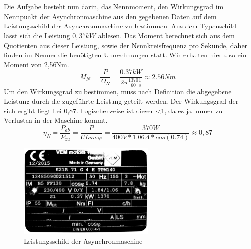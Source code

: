 \section{}
Die Aufgabe besteht nun darin, das Nennmoment, den Wirkungsgrad im Nennpunkt der Asynchronmaschine aus den gegebenen Daten auf dem Leistungsschild der Asynchronmaschine zu bestimmen. Aus dem Typenschild lässt sich die Leistung $ 0,37kW $ ablesen. Das Moment berechnet sich aus dem Quotienten aus dieser Leistung, sowie der Nennkreisfrequenz pro Sekunde, daher finden im Nenner die benötigten Umrechnungen statt. Wir erhalten hier also ein Moment von 2,56Nm.
\begin{equation}
	M_{N} = \frac{P}{\Omega_{N}} = \frac{0.37kW}{2\pi\frac{1370}{60}\frac{1}{s}} \approx 2.56Nm
\end{equation}
Um den Wirkungsgrad zu bestimmen, muss nach Definition die abgegebene Leistung durch die zugeführte Leistung geteilt werden. Der Wirkungsgrad der sich ergibt liegt bei 0,87. Logischerweise ist dieser <1, da es ja immer zu Verlusten in der Maschine kommt.
\begin{equation}
	\eta_{N} = \frac{P_{ab}}{P_{zu}} =  \frac{P}{UIcos\varphi} = \frac{370W}{400V*1.06A*cos(0.74)} \approx 0,87
\end{equation}
\begin{figure}[h]
	\centering
	\includegraphics[width=0.6\textwidth]{./Bilder/Typenschild.png}
	\caption{Leistungsschild der Asynchronmaschine}
	\label{fig:4c:typenschild}
\end{figure}
